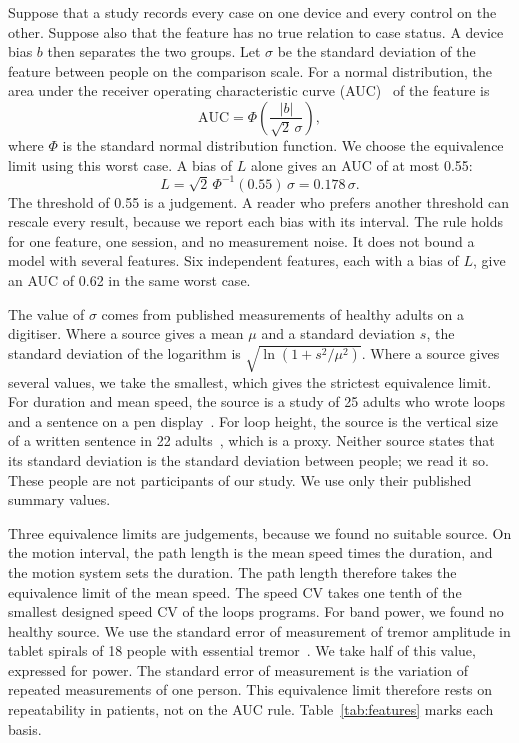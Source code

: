 Suppose that a study records every case on one device and every control on the other.
Suppose also that the feature has no true relation to case status.
A device bias $b$ then separates the two groups.
Let $\sigma$ be the standard deviation of the feature between people on the comparison scale.
For a normal distribution, the area under the receiver operating characteristic curve (AUC)~\cite{Hanley1982} of the feature is
\begin{equation}
\mathrm{AUC}=\Phi\!\left(\frac{|b|}{\sqrt{2}\,\sigma}\right),
\label{eq:auc}
\end{equation}
where $\Phi$ is the standard normal distribution function.
We choose the equivalence limit using this worst case.
A bias of $L$ alone gives an AUC of at most 0.55:
\begin{equation}
L=\sqrt{2}\,\Phi^{-1}(0.55)\,\sigma=0.178\,\sigma .
\label{eq:limit}
\end{equation}
The threshold of 0.55 is a judgement.
A reader who prefers another threshold can rescale every result, because we report each bias with its interval.
The rule holds for one feature, one session, and no measurement noise.
It does not bound a model with several features.
Six independent features, each with a bias of $L$, give an AUC of 0.62 in the same worst case.

The value of $\sigma$ comes from published measurements of healthy adults on a digitiser.
Where a source gives a mean $\mu$ and a standard deviation $s$, the standard deviation of the logarithm is $\sqrt{\ln(1+s^2/\mu^2)}$.
Where a source gives several values, we take the smallest, which gives the strictest equivalence limit.
For duration and mean speed, the source is a study of 25 adults who wrote loops and a sentence on a pen display~\cite{Gerth2016b}.
For loop height, the source is the vertical size of a written sentence in 22 adults~\cite{Bisio2016}, which is a proxy.
Neither source states that its standard deviation is the standard deviation between people; we read it so.
These people are not participants of our study.
We use only their published summary values.

Three equivalence limits are judgements, because we found no suitable source.
On the motion interval, the path length is the mean speed times the duration, and the motion system sets the duration.
The path length therefore takes the equivalence limit of the mean speed.
The speed CV takes one tenth of the smallest designed speed CV of the loops programs.
For band power, we found no healthy source.
We use the standard error of measurement of tremor amplitude in tablet spirals of 18 people with essential tremor~\cite{Elble2017}.
We take half of this value, expressed for power.
The standard error of measurement is the variation of repeated measurements of one person.
This equivalence limit therefore rests on repeatability in patients, not on the AUC rule.
Table~\ref{tab:features} marks each basis.

